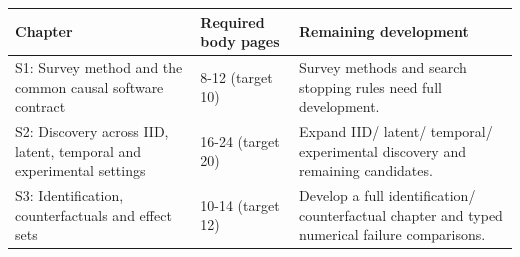 \documentclass[
  10pt,
]{article}
\begin{document}
\begin{longtable}[]{@{}>{\raggedright\arraybackslash}p{}>{\raggedright\arraybackslash}p{}>{\raggedright\arraybackslash}p{}@{}}
\toprule
\begin{minipage}[b]{\linewidth}\raggedright
Chapter\strut
\end{minipage} & \begin{minipage}[b]{\linewidth}\raggedright
Required body pages\strut
\end{minipage} & \begin{minipage}[b]{\linewidth}\raggedright
Remaining development\strut
\end{minipage}\tabularnewline
\midrule
\endhead
\begin{minipage}[t]{\linewidth}\raggedright
S1: Survey method and the common causal software contract\strut
\end{minipage} & \begin{minipage}[t]{\linewidth}\raggedright
8-12 (target 10)\strut
\end{minipage} & \begin{minipage}[t]{\linewidth}\raggedright
Survey methods and search stopping rules need full development.\strut
\end{minipage}\tabularnewline
\begin{minipage}[t]{\linewidth}\raggedright
S2: Discovery across IID, latent, temporal and experimental
settings\strut
\end{minipage} & \begin{minipage}[t]{\linewidth}\raggedright
16-24 (target 20)\strut
\end{minipage} & \begin{minipage}[t]{\linewidth}\raggedright
Expand IID/ latent/ temporal/ experimental discovery and remaining
candidates.\strut
\end{minipage}\tabularnewline
\begin{minipage}[t]{\linewidth}\raggedright
S3: Identification, counterfactuals and effect sets\strut
\end{minipage} & \begin{minipage}[t]{\linewidth}\raggedright
10-14 (target 12)\strut
\end{minipage} & \begin{minipage}[t]{\linewidth}\raggedright
Develop a full identification/ counterfactual chapter and typed
numerical failure comparisons.\strut
\end{minipage}\tabularnewline

\end{longtable}
\end{document}

